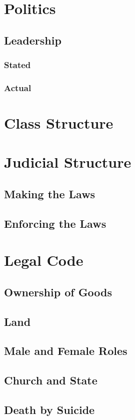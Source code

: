 \section{Politics}
\subsection{Leadership}
\subsubsection{Stated}
\subsubsection{Actual}


\section{Class Structure}

\section{Judicial Structure}
\subsection{Making the Laws}
\subsection{Enforcing the Laws}

\section{Legal Code}
\subsection{Ownership of Goods}
\subsection{Land}
\subsection{Male and Female Roles}
\subsection{Church and State}
\subsection{Death by Suicide}
